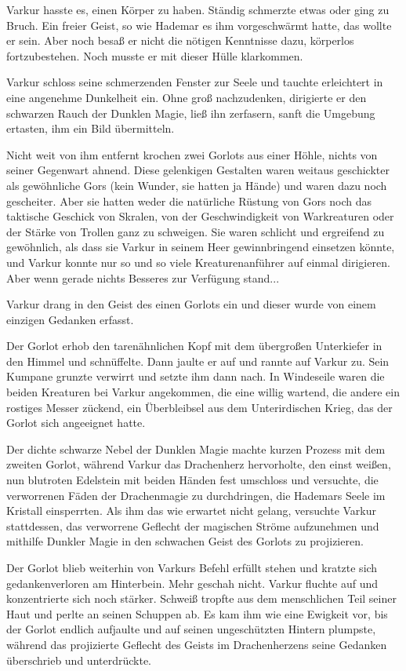 \documentclass[10pt, a4paper, oneside]{book}
\begin{document}
Varkur hasste es, einen Körper zu haben. Ständig schmerzte etwas oder ging zu Bruch. Ein freier Geist, so wie Hademar es ihm vorgeschwärmt hatte, das wollte er sein. Aber noch besaß er nicht die nötigen Kenntnisse dazu, körperlos fortzubestehen. Noch musste er mit dieser Hülle klarkommen.

Varkur schloss seine schmerzenden Fenster zur Seele und tauchte erleichtert in eine angenehme Dunkelheit ein. Ohne groß nachzudenken, dirigierte er den schwarzen Rauch der Dunklen Magie, ließ ihn zerfasern, sanft die Umgebung ertasten, ihm ein Bild übermitteln.

Nicht weit von ihm entfernt krochen zwei Gorlots aus einer Höhle, nichts von seiner Gegenwart ahnend. Diese gelenkigen Gestalten waren weitaus geschickter als gewöhnliche Gors (kein Wunder, sie hatten ja Hände) und waren dazu noch gescheiter. Aber sie hatten weder die natürliche Rüstung von Gors noch das taktische Geschick von Skralen, von der Geschwindigkeit von Warkreaturen oder der Stärke von Trollen ganz zu schweigen. Sie waren schlicht und ergreifend zu gewöhnlich, als dass sie Varkur in seinem Heer gewinnbringend einsetzen könnte, und Varkur konnte nur so und so viele Kreaturenanführer auf einmal dirigieren. Aber wenn gerade nichts Besseres zur Verfügung stand...

Varkur drang in den Geist des einen Gorlots ein und dieser wurde von einem einzigen Gedanken erfasst.

Der Gorlot erhob den tarenähnlichen Kopf mit dem übergroßen Unterkiefer in den Himmel und schnüffelte. Dann jaulte er auf und rannte auf Varkur zu. Sein Kumpane grunzte verwirrt und setzte ihm dann nach. In Windeseile waren die beiden Kreaturen bei Varkur angekommen, die eine willig wartend, die andere ein rostiges Messer zückend, ein Überbleibsel aus dem Unterirdischen Krieg, das der Gorlot sich angeeignet hatte.

Der dichte schwarze Nebel der Dunklen Magie machte kurzen Prozess mit dem zweiten Gorlot, während Varkur das Drachenherz hervorholte, den einst weißen, nun blutroten Edelstein mit beiden Händen fest umschloss und versuchte, die verworrenen Fäden der Drachenmagie zu durchdringen, die Hademars Seele im Kristall einsperrten. Als ihm das wie erwartet nicht gelang, versuchte Varkur stattdessen, das verworrene Geflecht der magischen Ströme aufzunehmen und mithilfe Dunkler Magie in den schwachen Geist des Gorlots zu projizieren.

Der Gorlot blieb weiterhin von Varkurs Befehl erfüllt stehen und kratzte sich gedankenverloren am Hinterbein. Mehr geschah nicht. Varkur fluchte auf und konzentrierte sich noch stärker. Schweiß tropfte aus dem menschlichen Teil seiner Haut und perlte an seinen Schuppen ab. Es kam ihm wie eine Ewigkeit vor, bis der Gorlot endlich aufjaulte und auf seinen ungeschützten Hintern plumpste, während das projizierte Geflecht des Geists im Drachenherzens seine Gedanken überschrieb und unterdrückte.
\end{document}
